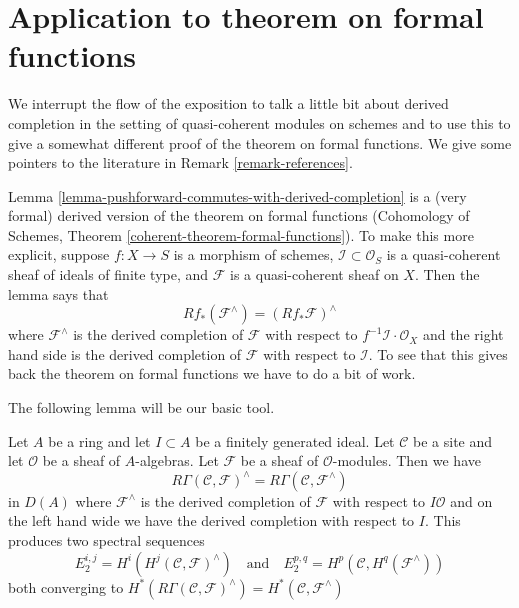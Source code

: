 \section{Application to theorem on formal functions}
\label{section-formal-functions}

\noindent
We interrupt the flow of the exposition to talk a little bit about
derived completion in the setting of quasi-coherent modules on schemes
and to use this to give a somewhat different proof of the theorem on
formal functions. We give some pointers to the literature in
Remark \ref{remark-references}.

\medskip\noindent
Lemma \ref{lemma-pushforward-commutes-with-derived-completion} is a
(very formal) derived version of the theorem on formal functions
(Cohomology of Schemes, Theorem \ref{coherent-theorem-formal-functions}).
To make this more explicit, suppose $f : X \to S$ is a morphism of schemes,
$\mathcal{I} \subset \mathcal{O}_S$ is a quasi-coherent sheaf of ideals
of finite type,
and $\mathcal{F}$ is a quasi-coherent sheaf on $X$. Then the lemma says that
\begin{equation}
\label{equation-formal-functions}
Rf_*(\mathcal{F}^\wedge) = (Rf_*\mathcal{F})^\wedge
\end{equation}
where $\mathcal{F}^\wedge$ is the derived completion of $\mathcal{F}$
with respect to $f^{-1}\mathcal{I} \cdot \mathcal{O}_X$ and the right
hand side is the derived completion of $\mathcal{F}$
with respect to $\mathcal{I}$. To see that this gives back the theorem
on formal functions we have to do a bit of work.

\medskip\noindent
The following lemma will be our basic tool.

\begin{lemma}
\label{lemma-formal-functions-general}
Let $A$ be a ring and let $I \subset A$ be a finitely generated ideal.
Let $\mathcal{C}$ be a site and let $\mathcal{O}$ be a sheaf
of $A$-algebras. Let $\mathcal{F}$ be a sheaf of $\mathcal{O}$-modules.
Then we have
$$
R\Gamma(\mathcal{C}, \mathcal{F})^\wedge =
R\Gamma(\mathcal{C}, \mathcal{F}^\wedge)
$$
in $D(A)$ where $\mathcal{F}^\wedge$ is the derived
completion of $\mathcal{F}$ with respect to $I\mathcal{O}$ and on the
left hand wide we have the derived completion with respect to $I$.
This produces two spectral sequences
$$
E_2^{i, j} = H^i(H^j(\mathcal{C}, \mathcal{F})^\wedge)
\quad\text{and}\quad
E_2^{p, q} = H^p(\mathcal{C}, H^q(\mathcal{F}^\wedge))
$$
both converging to
$H^*(R\Gamma(\mathcal{C}, \mathcal{F})^\wedge) =
H^*(\mathcal{C}, \mathcal{F}^\wedge)$
\end{lemma}

